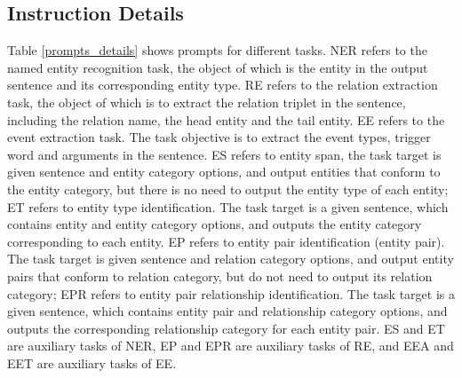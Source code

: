 \documentclass[11pt]{article}
\begin{document}
\subsection{Instruction Details}
Table \ref{prompts_details} shows prompts for different tasks. NER refers to the named entity recognition task, the object of which is the entity in the output sentence and its corresponding entity type. RE refers to the relation extraction task, the object of which is to extract the relation triplet in the sentence, including the relation name, the head entity and the tail entity. EE refers to the event extraction task. The task objective is to extract the event types, trigger word and arguments in the sentence. ES refers to entity span, the task target is given sentence and entity category options, and output entities that conform to the entity category, but there is no need to output the entity type of each entity; ET refers to entity type identification. The task target is a given sentence, which contains entity and entity category options, and outputs the entity category corresponding to each entity. EP refers to entity pair identification (entity pair). The task target is given sentence and relation category options, and output entity pairs that conform to relation category, but do not need to output its relation category; EPR refers to entity pair relationship identification. The task target is a given sentence, which contains entity pair and relationship category options, and outputs the corresponding relationship category for each entity pair. ES and ET are auxiliary tasks of NER, EP and EPR are auxiliary tasks of RE, and EEA and EET are auxiliary tasks of EE.
\end{document}
